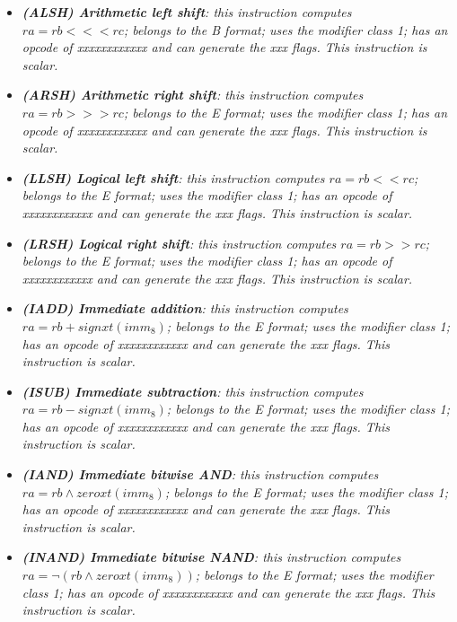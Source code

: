 \begin{multicols}{2}
\begin{itemize}
                \item \textit{\textbf{(ALSH) Arithmetic left shift}: this instruction computes \(ra = rb <<< rc\); belongs to the B format; uses the modifier class 1; has an opcode of xxxxxxxxxxxx and can generate the xxx flags. This instruction is scalar.}

                \item \textit{\textbf{(ARSH) Arithmetic right shift}: this instruction computes \(ra = rb >>> rc\); belongs to the E format; uses the modifier class 1; has an opcode of xxxxxxxxxxxx and can generate the xxx flags. This instruction is scalar.}

                \item \textit{\textbf{(LLSH) Logical left shift}: this instruction computes \(ra = rb << rc\); belongs to the E format; uses the modifier class 1; has an opcode of xxxxxxxxxxxx and can generate the xxx flags. This instruction is scalar.}

                \item \textit{\textbf{(LRSH) Logical right shift}: this instruction computes \(ra = rb >> rc\); belongs to the E format; uses the modifier class 1; has an opcode of xxxxxxxxxxxx and can generate the xxx flags. This instruction is scalar.}

                \item \textit{\textbf{(IADD) Immediate addition}: this instruction computes \(ra = rb + signxt(imm_8)\); belongs to the E format; uses the modifier class 1; has an opcode of xxxxxxxxxxxx and can generate the xxx flags. This instruction is scalar.}

                \item \textit{\textbf{(ISUB) Immediate subtraction}: this instruction computes \(ra = rb - signxt(imm_8)\); belongs to the E format; uses the modifier class 1; has an opcode of xxxxxxxxxxxx and can generate the xxx flags. This instruction is scalar.}

                \item \textit{\textbf{(IAND) Immediate bitwise AND}: this instruction computes \(ra = rb \wedge zeroxt(imm_8)\); belongs to the E format; uses the modifier class 1; has an opcode of xxxxxxxxxxxx and can generate the xxx flags. This instruction is scalar.}

                \item \textit{\textbf{(INAND) Immediate bitwise NAND}: this instruction computes \(ra = \neg(rb \wedge zeroxt(imm_8))\); belongs to the E format; uses the modifier class 1; has an opcode of xxxxxxxxxxxx and can generate the xxx flags. This instruction is scalar.}


\end{itemize}
\end{multicols}
